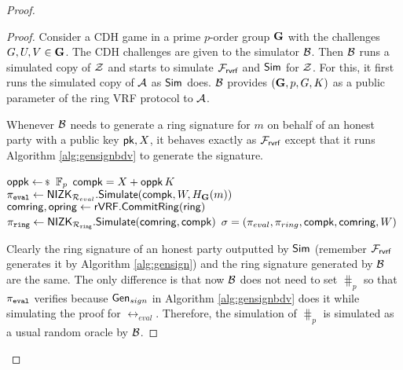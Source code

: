 \begin{proof}
\begin{proof}
			Consider a CDH game in a prime $ p $-order group  $ {\mathbf{G}} $ with the challenges $ G,U, V \in {\mathbf{G}}$. The CDH challenges are given to the simulator $ \mathcal{B} $. Then $ \mathcal{B} $ runs a simulated copy of $ \mathcal{Z} $ and starts to simulate $ \mathcal{F}_{\textsf{rvrf}} $ and $ \mathsf{Sim} $ for $ \mathcal{Z} $. For this, it first runs the simulated copy of $ \mathcal{A} $ as $ \mathsf{Sim} $ does. $ \mathcal{B} $ provides $ ({\mathbf{G}}, p, G , K) $ as a public parameter of the ring VRF protocol to $ \mathcal{A} $.
			
			Whenever $ \mathcal{B} $ needs to generate a ring signature for $ m $ on behalf of an honest party with a public key $ \mathsf{pk},X $, it behaves exactly as $ \mathcal{F}_{\textsf{rvrf}} $ except that it runs   Algorithm \ref{alg:gensignbdv} to generate the signature. 
			
			
			\begin{algorithm}
				\caption{$\gen_{sign}(\ring,W,\{X,\pk\},\aux,m)$}
				\label{alg:gensignbdv}	 	
				\begin{algorithmic}[1]
					\State $ \openpk \leftsample \FF_p $
					\State $ \mathsf{compk} =  X + \mathsf{oppk} \, K$
					\State $ \pi_{\mathtt{eval}} \leftarrow {\ensuremath{\mathsf{NIZK}}}_{\mathcal{R}_{eval}}.{\mathsf{Simulate}}(\mathsf{compk}, W,H_{\mathbf{G}}(m)) $
					\State $ \mathsf{comring}, \mathsf{opring} \leftarrow {\ensuremath{\mathsf{rVRF}}}.{\mathsf{CommitRing}}(\mathsf{ring}) $
					\State $ \pi_{\mathtt{ring}} \leftarrow {\ensuremath{\mathsf{NIZK}}}_{\mathcal{R}_{\mathtt{ring}}}.{\mathsf{Simulate}}(\mathsf{comring}, \mathsf{compk}) $ 
					\State\Return$ \sigma = (\pi_{eval},\pi_{ring},\mathsf{compk},\mathsf{comring},W) $
				\end{algorithmic}
				
			\end{algorithm}
			
			
			Clearly the ring signature of an honest party outputted by $ \mathsf{Sim} $ (remember $ \mathcal{F}_{\textsf{rvrf}}$ generates it by Algorithm \ref{alg:gensign}) and the ring signature generated by $ \mathcal{B} $ are the same. The only difference is that now $ \mathcal{B} $ does not need to set $ \hash_p $ so that $ \pi_{\mathtt{eval}} $ verifies because $ \mathsf{Gen}_{sign} $ in Algorithm \ref{alg:gensignbdv} does it while simulating the proof for $ \rel_{eval} $. Therefore, the simulation of $ \hash_p $ is simulated as a usual random oracle by $ \mathcal{B} $.
			

\end{proof}
\end{proof}
